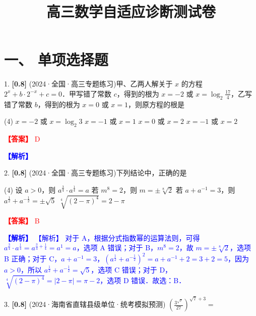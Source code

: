 \documentclass[11pt,a4paper]{article}
\title{\vspace{-2cm}\textbf{高三数学自适应诊断测试卷}}
\date{}
\begin{document}
\maketitle
\vspace{-1cm}
\section*{一、 单项选择题}
1. \textbf{[0.8]} (2024·全国·高三专题练习)甲、乙两人解关于 $x$ 的方程 $2^{x}+b \cdot 2^{-x}+c=0$．甲写错了常数 $c$，得到的根为 $x=-2$ 或 $x=\log _{2} \frac{17}{4}$，乙写错了常数 $b$，得到的根为 $x=0$ 或 $x=1$，则原方程的根是

\begin{tasks}(4)
    \task $x=-2$ 或 $x=\log _{2} 3$
    \task $x=-1$ 或 $x=1$
    \task $x=0$ 或 $x=2$
    \task $x=-1$ 或 $x=2$
\end{tasks}

\par\noindent\textcolor{red}{\textbf{【答案】} D}
\par\noindent\textcolor{blue}{\textbf{【解析】} }

\vspace{0.5cm}

2. \textbf{[0.8]} (2024·全国·高三专题练习)下列结论中，正确的是

\begin{tasks}(4)
    \task 设 $a>0$，则 $a^{\frac{3}{4}} \cdot a^{\frac{1}{4}}=a$
    \task 若 $m^{8}=2$，则 $m=\pm \sqrt[8]{2}$
    \task 若 $a+a^{-1}=3$，则 $a^{\frac{1}{2}}+a^{-\frac{1}{2}}=\pm \sqrt{5}$
    \task $\sqrt[4]{(2-\pi)^{4}}=2-\pi$
\end{tasks}

\par\noindent\textcolor{red}{\textbf{【答案】} B}
\par\noindent\textcolor{blue}{\textbf{【解析】} 【解析】 对于 A，根据分式指数幂的运算法则，可得 $a^{\frac{3}{4}} \cdot a^{\frac{1}{4}}=a^{\frac{3}{4}+\frac{1}{4}}=a^{1}=a$，选项 A 错误；对于 B，$m^{8}=2$，故 $m=\pm \sqrt[8]{2}$，选项 B 正确；对于 C，$a+a^{-1}=3$，$\left(a^{\frac{1}{2}}+a^{-\frac{1}{2}}\right)^{2}=a+a^{-1}+2=3+2=5$，因为 $a>0$，所以 $a^{\frac{1}{2}}+a^{-\frac{1}{2}}=\sqrt{5}$，选项 C 错误；对于 D，$\sqrt[4]{(2-\pi)^{4}}=|2-\pi|=\pi-2$，选项 D 错误．故选：B．}

\vspace{0.5cm}

3. \textbf{[0.8]} (2024·海南省直辖县级单位·统考模拟预测) $\left(\frac{3^{\sqrt{7}}}{27}\right)^{\sqrt{7}+3}=$
\end{document}
